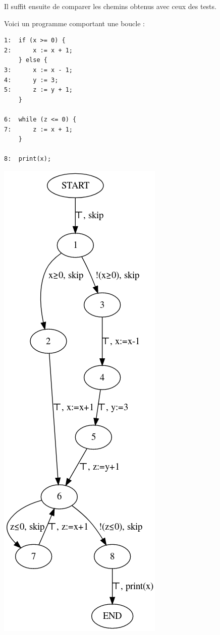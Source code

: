 Il suffit ensuite de comparer les chemins obtenus avec ceux des tests.

Voici un programme comportant une boucle :

\begin{minipage}{0.46\textwidth}
\begin{verbatim}
1:  if (x >= 0) {
2:      x := x + 1;
    } else {
3:      x := x - 1;
4:      y := 3;
5:      z := y + 1;
    }

6:  while (z <= 0) {
7:      z := x + 1;
    }

8:  print(x);
\end{verbatim}
\end{minipage}
\begin{minipage}{0.46\textwidth}
	\includegraphics[scale=0.5]{pics/whileCFG.png}
\end{minipage}

